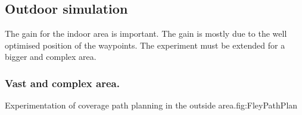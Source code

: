\subsection{Outdoor simulation}\label{coverageOutDoor}

The gain for the indoor area is important. The gain is mostly due to the well optimised position of the waypoints. The experiment must be extended  for a bigger and complex area.


\subsubsection{Vast and complex area.} \label{trajectoire path}
 
 \begin{mfigures}[!]{Experimentation of coverage path planning in the outside area.}{fig:FleyPathPlan} \centering
\hspace{1cm}

\tabsimuposeVrepPath
\end{mfigures} 
 
 

